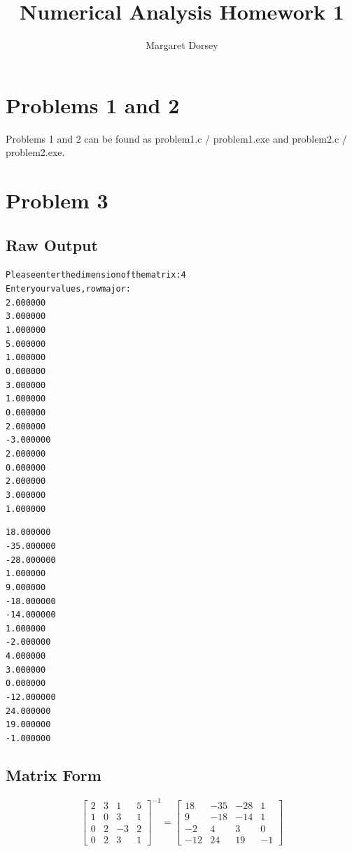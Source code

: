\documentclass[11pt]{article} %
\title{Numerical Analysis Homework 1}
\author{Margaret Dorsey}
\begin{document}
\maketitle

\section*{Problems 1 and 2}
\par Problems 1 and 2 can be found as problem1.c / problem1.exe and problem2.c / problem2.exe.

\section*{Problem 3}
\subsection*{Raw Output}
\begin{alltt}
Please enter the dimension of the matrix: 4
Enter your values, row major: 
2.000000
3.000000
1.000000
5.000000
1.000000
0.000000
3.000000
1.000000
0.000000
2.000000
-3.000000
2.000000
0.000000
2.000000
3.000000
1.000000

18.000000
-35.000000
-28.000000
1.000000
9.000000
-18.000000
-14.000000
1.000000
-2.000000
4.000000
3.000000
0.000000
-12.000000
24.000000
19.000000
-1.000000
\end{alltt}
\subsection*{Matrix Form}
\[
\begin{bmatrix}
2&3&1&5\\
1&0&3&1\\
0&2&-3&2 \\
0&2&3&1
\end{bmatrix}
^{-1}
=
\begin{bmatrix}
18&-35&-28&1\\
9&-18&-14&1\\
-2&4&3&0 \\
-12&24&19&-1
\end{bmatrix}
\]
\end{document}
